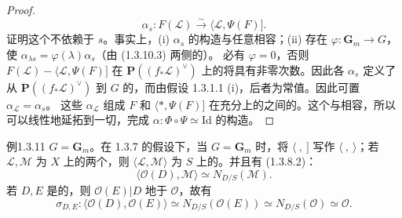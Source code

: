 \begin{proof}
\begin{equation}\alpha_s:F(\mathscr L)\xrightarrow\sim\langle\mathscr L,\Psi(F)].\tag{1.3.10.3}\end{equation}
证明这个不依赖于 $s$。事实上，(i) $\alpha_s$ 的构造与任意相容；(ii) 存在 $\varphi:\mathbf G_m\to G$，使 $\alpha_{\lambda s}=\varphi(\lambda)\alpha_s$（由 (1.3.10.3) 两侧的）。
必有 $\varphi=0$，否则 $F(\mathscr L)-\langle\mathscr L,\Psi(F)]$ 在 $\mathbf P((f_*\mathscr L)^\vee)$ 上的将具有非零次数。因此各 $\alpha_s$ 定义了从 $\mathbf P((f_*\mathscr L)^\vee)$ 到 $G$ 的，而由假设 1.3.1.1 (i)，后者为常值。因此可置 $\alpha_{\mathscr L}=\alpha_s$。
这些 $\alpha_{\mathscr L}$ 组成 $F$ 和 $\langle *,\Psi(F)]$ 在充分上的之间的。这个与相容，所以可以线性地延拓到一切，完成 $\alpha:\Phi\circ\Psi\simeq\mathrm{Id}$ 的构造。
\end{proof}
\begin{SGAresult}{例}{1.3.11}
$G=\mathbf G_m$。在 1.3.7 的假设下，当 $G=\mathbf G_m$ 时，将 $\langle\ ,\ ]$ 写作 $\langle\ ,\ \rangle$；若 $\mathscr L,\mathscr M$ 为 $X$ 上的两个，则 $\langle\mathscr L,\mathscr M\rangle$ 为 $S$ 上的。并且有 (1.3.8.2)：
\[\langle\mathscr O(D),\mathscr M\rangle\simeq N_{D/S}(\mathscr M).\]
若 $D,E$ 是的，则 $\mathscr O(E)|D$ 地于 $\mathscr O$，故有
\begin{equation}\sigma_{D,E}:\langle\mathscr O(D),\mathscr O(E)\rangle\simeq N_{D/S}(\mathscr O(E))\simeq N_{D/S}(\mathscr O)\simeq\mathscr O.\tag{1.3.11.1}\end{equation}
\end{SGAresult}
